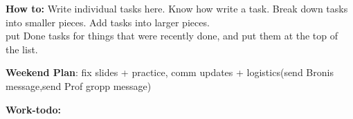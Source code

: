 \documentclass[11pt]{article}
\begin{document}
\newpage 
\textbf{How to:} Write individual tasks here. Know how write a task. 
Break down tasks into smaller pieces. Add tasks into larger
pieces. \\ put Done tasks for things that were recently done, and put
them at the top of the list. 




\textbf{Weekend Plan}:  fix slides + practice, comm
updates + logistics(send Bronis message,send Prof gropp message)  

\textbf{Work-todo:}\\
\end{document}
